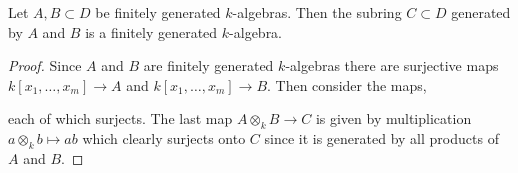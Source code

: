 \documentclass[12pt]{article}
\begin{document}
\begin{lemma} \label{compositum_fin_gen}
Let $A, B \subset D$ be finitely generated $k$-algebras. Then the subring $C \subset D$ generated by $A$ and $B$ is a finitely generated $k$-algebra. 
\end{lemma}

\begin{proof}
Since $A$ and $B$ are finitely generated $k$-algebras there are surjective maps $k[x_1, \dots, x_m] \to A$ and $k[x_1, \dots, x_m] \to B$. Then consider the maps,
\begin{center}
\end{center}
each of which surjects. The last map $A \otimes_k B \to C$ is given by multiplication $a \otimes_k b \mapsto ab$ which clearly surjects onto $C$ since it is generated by all products of $A$ and $B$. 
\end{proof}
\end{document}
